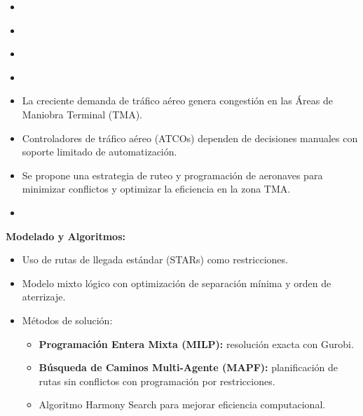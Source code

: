 
\begin{frame}
    \begin{itemize}
        \item \cite{2024_Yi_Zhang}
        \item \cite{Guo_2024_CCDF}
        \item \cite{lavandier_selective_2021}
        \item \cite{mateos_multiobjective_2016}
    \end{itemize}
\end{frame}
\begin{frame}{\parencite{2024_Yi_Zhang} }{}
    \begin{itemize}
        \item La creciente demanda de tráfico aéreo genera congestión en las Áreas de Maniobra Terminal (TMA).
        \item Controladores de tráfico aéreo (ATCOs) dependen de decisiones manuales con soporte limitado de automatización.
        \item Se propone una estrategia de ruteo y programación de aeronaves para minimizar conflictos y optimizar la eficiencia en la zona TMA.
        \item {}
    \end{itemize}
\end{frame}

\begin{frame}{\parencite{2024_Yi_Zhang} }{}
    \textbf{Modelado y Algoritmos:}
    \begin{itemize}
        \item Uso de rutas de llegada estándar (STARs) como restricciones.
        \item Modelo mixto lógico con optimización de separación mínima y orden de aterrizaje.
        \item Métodos de solución:
              \begin{itemize}
                  \item \textbf{Programación Entera Mixta (MILP):} resolución exacta con Gurobi.
                  \item \textbf{Búsqueda de Caminos Multi-Agente (MAPF):} planificación de rutas sin conflictos con programación por restricciones.
                  \item {} Algoritmo Harmony Search para mejorar eficiencia computacional.
              \end{itemize}
    \end{itemize}
\end{frame}

